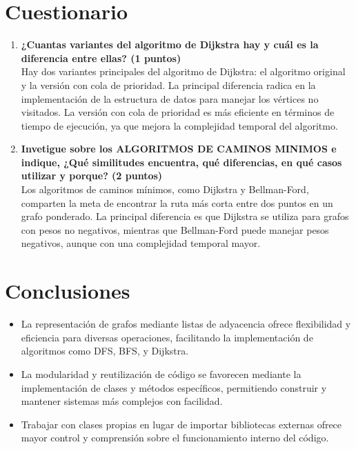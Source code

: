 \documentclass{article}
\begin{document}
                
        \section{Cuestionario}    

        \begin{enumerate}
            \item {\textbf{¿Cuantas variantes del algoritmo de Dijkstra hay y cuál es la diferencia entre ellas? (1 puntos)}} \\
            Hay dos variantes principales del algoritmo de Dijkstra: el algoritmo original y la versión con cola de prioridad. La principal diferencia radica en la implementación de la estructura de datos para manejar los vértices no visitados. La versión con cola de prioridad es más eficiente en términos de tiempo de ejecución, ya que mejora la complejidad temporal del algoritmo.

            \item {\textbf{Invetigue sobre los ALGORITMOS DE CAMINOS MINIMOS e indique, ¿Qué similitudes encuentra, qué diferencias, en qué casos utilizar y porque? (2 puntos)}}\\
            Los algoritmos de caminos mínimos, como Dijkstra y Bellman-Ford, comparten la meta de encontrar la ruta más corta entre dos puntos en un grafo ponderado. La principal diferencia es que Dijkstra se utiliza para grafos con pesos no negativos, mientras que Bellman-Ford puede manejar pesos negativos, aunque con una complejidad temporal mayor.
        \end{enumerate}


        \section{Conclusiones}
            \begin{itemize}
                \item La representación de grafos mediante listas de adyacencia ofrece flexibilidad y eficiencia para diversas operaciones, facilitando la implementación de algoritmos como DFS, BFS, y Dijkstra.
                \item La modularidad y reutilización de código se favorecen mediante la implementación de clases y métodos específicos, permitiendo construir y mantener sistemas más complejos con facilidad.
                \item Trabajar con clases propias en lugar de importar bibliotecas externas ofrece mayor control y comprensión sobre el funcionamiento interno del código. 
            \end{itemize}
            
\end{document}
